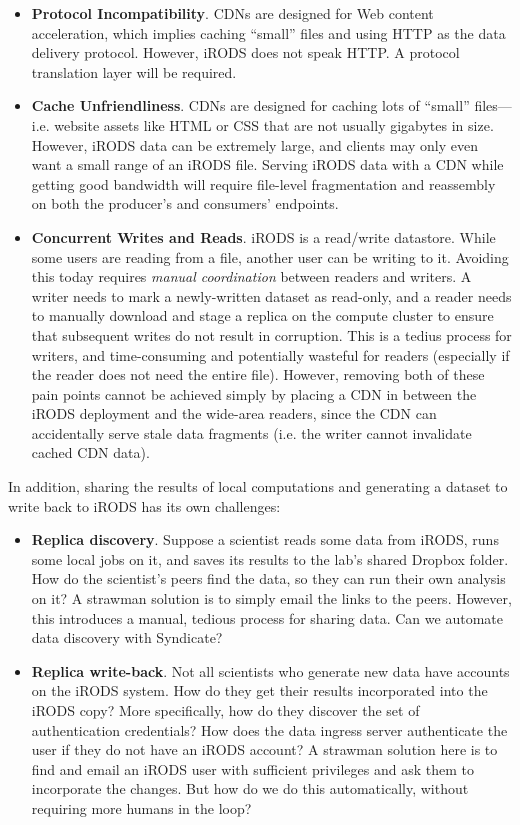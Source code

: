 \begin{itemize}
\item \textbf{Protocol Incompatibility}.  CDNs are designed for Web content
acceleration, which implies caching ``small'' files and
using HTTP as the data delivery protocol.  However,
iRODS does not speak HTTP.  A protocol translation layer will be required.
\item \textbf{Cache Unfriendliness}.  CDNs are designed for caching lots of
``small'' files---i.e. website assets like HTML or CSS that are not usually
gigabytes in size.  However, iRODS data can be extremely large, and clients may
only even want a small range of an iRODS file.  Serving iRODS data with a CDN
while getting good bandwidth will require file-level fragmentation and reassembly
on both the producer's and consumers' endpoints.
\item \textbf{Concurrent Writes and Reads}.  iRODS is a read/write datastore.
While some users are reading from a file, another user can be writing to it.
Avoiding this today requires \emph{manual coordination} between readers and
writers.  A writer needs to mark a newly-written dataset as read-only, and a
reader needs to manually download and stage a replica on the compute cluster to
ensure that subsequent writes do not result in corruption.  This is a tedius
process for writers, and time-consuming and potentially wasteful for readers
(especially if the reader does not need the entire file).  However, removing both of
these pain points cannot be achieved simply by placing a CDN in between the
iRODS deployment and the wide-area readers, since the CDN can accidentally serve
stale data fragments (i.e. the writer cannot invalidate cached CDN data).
\end{itemize}

In addition, sharing the results of local computations and generating a
dataset to write back to iRODS has its own challenges:

\begin{itemize}
\item \textbf{Replica discovery}.  Suppose a scientist reads some data from iRODS,
runs some local jobs on it, and saves its results to the lab's shared Dropbox
folder.  How do the scientist's peers find the data, so they can run their own
analysis on it?  A strawman solution is to simply email the links to the peers.
However, this introduces a manual, tedious process for sharing data.  Can we
automate data discovery with Syndicate?
\item \textbf{Replica write-back}.  Not all scientists who generate new data
have accounts on the iRODS system.  How do they get their results incorporated
into the iRODS copy?  More specifically, how do they discover the set of
authentication credentials?  How does the data ingress server authenticate the
user if they do not have an iRODS account?  A strawman solution here is to find
and email an iRODS user with sufficient privileges and ask them to incorporate
the changes.  But how do we do this automatically, without requiring more humans
in the loop?
\end{itemize}

